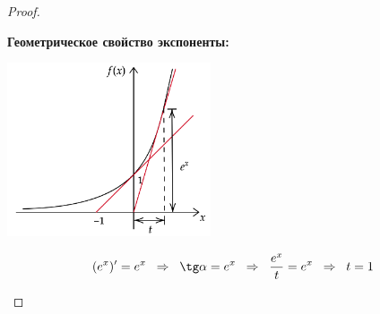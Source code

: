 \documentclass[12pt]{article} %
\theoremstyle{definition} %
\begin{document}
\begin{proof}
\begin{itemize}[label={$\bullet$}]
            \textbf{Геометрическое свойство экспоненты:}\par
            \begin{center}
               \includegraphics[width=6cm]{images/pic04_06.png}
            \end{center} 
            \[ 
            (e^x)' = e^x \hspace{0.2cm} \Rightarrow \hspace{0.2cm} \tg \alpha = e^x \hspace{0.2cm} \Rightarrow  \hspace{0.2cm} \frac{e^x}{t} = e^x \hspace{0.2cm} \Rightarrow \hspace{0.2cm} t = 1
            \] \par
            

\end{itemize}
\end{proof}
\end{document}
